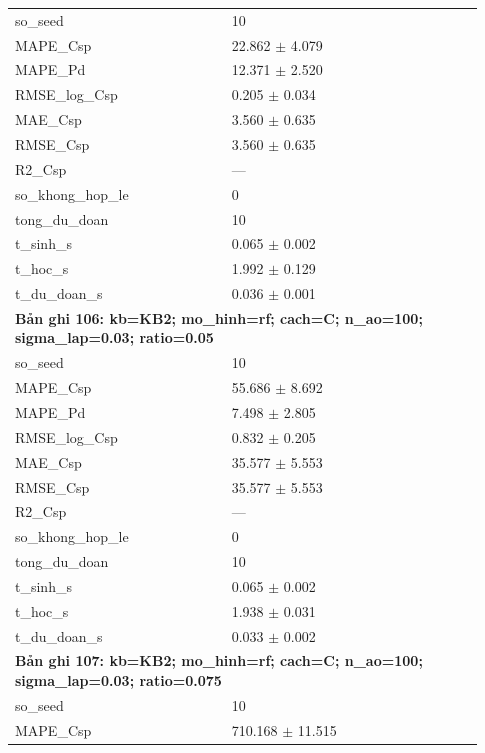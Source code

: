\begin{longtable}{p{0.43\linewidth}p{0.50\linewidth}}
so\_\allowbreak seed & 10 \\
MAPE\_\allowbreak Csp & 22.862 $\pm$ 4.079 \\
MAPE\_\allowbreak Pd & 12.371 $\pm$ 2.520 \\
RMSE\_\allowbreak log\_\allowbreak Csp & 0.205 $\pm$ 0.034 \\
MAE\_\allowbreak Csp & 3.560 $\pm$ 0.635 \\
RMSE\_\allowbreak Csp & 3.560 $\pm$ 0.635 \\
R2\_\allowbreak Csp & — \\
so\_\allowbreak khong\_\allowbreak hop\_\allowbreak le & 0 \\
tong\_\allowbreak du\_\allowbreak doan & 10 \\
t\_\allowbreak sinh\_\allowbreak s & 0.065 $\pm$ 0.002 \\
t\_\allowbreak hoc\_\allowbreak s & 1.992 $\pm$ 0.129 \\
t\_\allowbreak du\_\allowbreak doan\_\allowbreak s & 0.036 $\pm$ 0.001 \\
\midrule
\multicolumn{2}{p{0.95\linewidth}}{\textbf{Bản ghi 106: kb=KB2; mo\_hinh=rf; cach=C; n\_ao=100; sigma\_lap=0.03; ratio=0.05}} \\
so\_\allowbreak seed & 10 \\
MAPE\_\allowbreak Csp & 55.686 $\pm$ 8.692 \\
MAPE\_\allowbreak Pd & 7.498 $\pm$ 2.805 \\
RMSE\_\allowbreak log\_\allowbreak Csp & 0.832 $\pm$ 0.205 \\
MAE\_\allowbreak Csp & 35.577 $\pm$ 5.553 \\
RMSE\_\allowbreak Csp & 35.577 $\pm$ 5.553 \\
R2\_\allowbreak Csp & — \\
so\_\allowbreak khong\_\allowbreak hop\_\allowbreak le & 0 \\
tong\_\allowbreak du\_\allowbreak doan & 10 \\
t\_\allowbreak sinh\_\allowbreak s & 0.065 $\pm$ 0.002 \\
t\_\allowbreak hoc\_\allowbreak s & 1.938 $\pm$ 0.031 \\
t\_\allowbreak du\_\allowbreak doan\_\allowbreak s & 0.033 $\pm$ 0.002 \\
\midrule
\multicolumn{2}{p{0.95\linewidth}}{\textbf{Bản ghi 107: kb=KB2; mo\_hinh=rf; cach=C; n\_ao=100; sigma\_lap=0.03; ratio=0.075}} \\
so\_\allowbreak seed & 10 \\
MAPE\_\allowbreak Csp & 710.168 $\pm$ 11.515 \\

\end{longtable}
